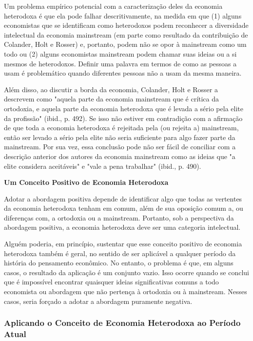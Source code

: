 \documentclass[a4paper,12pt]{article}[abntex2]
\begin{document}
Um problema empírico potencial com a caracterização deles da economia heterodoxa é que ela pode falhar descritivamente, na medida em que (1) alguns economistas que se identificam como heterodoxos podem reconhecer a diversidade intelectual da economia mainstream (em parte como resultado da contribuição de Colander, Holt e Rosser) e, portanto, podem não se opor à mainstream como um todo ou (2) alguns economistas mainstream podem chamar suas ideias ou a si mesmos de heterodoxos. Definir uma palavra em termos de como as pessoas a usam é problemático quando diferentes pessoas não a usam da mesma maneira.

Além disso, ao discutir a borda da economia, Colander, Holt e Rosser a descrevem como "aquela parte da economia mainstream que é crítica da ortodoxia, e aquela parte da economia heterodoxa que é levada a sério pela elite da profissão" (ibid., p. 492). Se isso não estiver em contradição com a afirmação de que toda a economia heterodoxa é rejeitada pela (ou rejeita a) mainstream, então ser levado a sério pela elite não seria suficiente para algo fazer parte da mainstream. Por sua vez, essa conclusão pode não ser fácil de conciliar com a descrição anterior dos autores da economia mainstream como as ideias que "a elite considera aceitáveis" e "vale a pena trabalhar" (ibid., p. 490).

\textbf{Um Conceito Positivo de Economia Heterodoxa}

Adotar a abordagem positiva depende de identificar algo que todas as vertentes da economia heterodoxa tenham em comum, além de sua oposição comum a, ou diferenças com, a ortodoxia ou a mainstream. Portanto, sob a perspectiva da abordagem positiva, a economia heterodoxa deve ser uma categoria intelectual.

Alguém poderia, em princípio, sustentar que esse conceito positivo de economia heterodoxa também é geral, no sentido de ser aplicável a qualquer período da história do pensamento econômico. No entanto, o problema é que, em alguns casos, o resultado da aplicação é um conjunto vazio. Isso ocorre quando se conclui que é impossível encontrar quaisquer ideias significativas comuns a todo economista ou abordagem que não pertença à ortodoxia ou à mainstream. Nesses casos, seria forçado a adotar a abordagem puramente negativa.

\subsubsection{\textbf{Aplicando o Conceito de Economia Heterodoxa ao Período Atual}}
\end{document}

